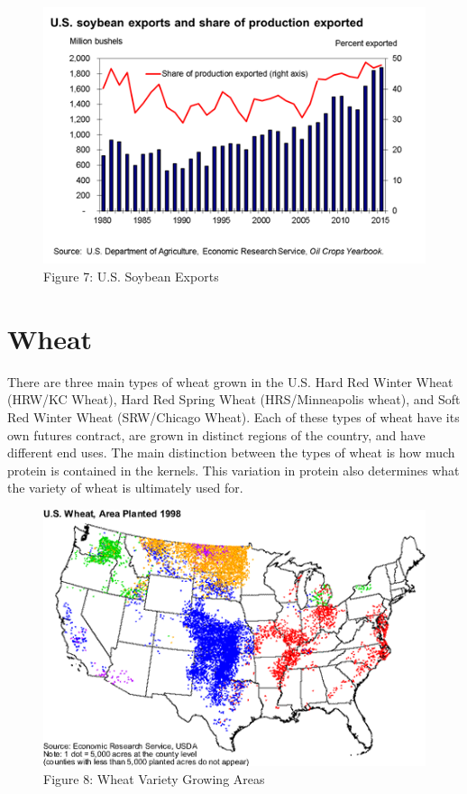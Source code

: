 \documentclass[]{book}
\theoremstyle{definition}
\theoremstyle{definition}
\theoremstyle{remark}
\begin{document}
\begin{figure}[htbp]
\centering
\includegraphics{images/Soy-Exports-Share-Production.png}
\caption{Figure 7: U.S. Soybean Exports}
\end{figure}

\section{Wheat}\label{wheat}

There are three main types of wheat grown in the U.S. Hard Red Winter
Wheat (HRW/KC Wheat), Hard Red Spring Wheat (HRS/Minneapolis wheat), and
Soft Red Winter Wheat (SRW/Chicago Wheat). Each of these types of wheat
have its own futures contract, are grown in distinct regions of the
country, and have different end uses. The main distinction between the
types of wheat is how much protein is contained in the kernels. This
variation in protein also determines what the variety of wheat is
ultimately used for.

\begin{figure}[htbp]
\centering
\includegraphics{images/Wheat-Growing-Areas.png}
\caption{Figure 8: Wheat Variety Growing Areas}
\end{figure}
\end{document}
